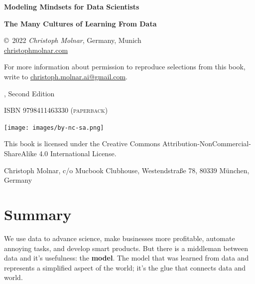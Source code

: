 \documentclass[
  10pt,
]{scrbook}
\begin{document}
\thispagestyle{empty}
\begin{center}
  {
  \bfseries \sffamily \LARGE Modeling Mindsets for Data Scientists \par
  \bfseries \small The Many Cultures of Learning From Data  \par
}

\copyright~2022 \textit{Christoph Molnar}, Germany, Munich\\
\url{christophmolnar.com}

For more information about permission to reproduce selections from this book, write to \url{christoph.molnar.ai@gmail.com}.

	\the\year, Second Edition

\ifxetex
	\textsc{ISBN 9798411463330 (paperback)} 
\fi

\texttt{[image: images/by-nc-sa.png]}

This book is licensed under the Creative Commons Attribution-NonCommercial-ShareAlike 4.0 International License.
  
  Christoph Molnar,
  c/o Mucbook Clubhouse,
  Westendstraße 78,
  80339 München, Germany

\end{center}

\newpage
\thispagestyle{empty}
\mbox{}
\newpage








{
\hypersetup{linkcolor=}
\setcounter{tocdepth}{1}
\tableofcontents
}
\hypertarget{summary}{%
\chapter*{Summary}\label{summary}}


We use data to advance science, make businesses more profitable, automate annoying tasks, and develop smart products.
But there is a middleman between data and it's usefulness: the \textbf{model}.
The model that was learned from data and represents a simplified aspect of the world; it's the glue that connects data and world.
\end{document}
